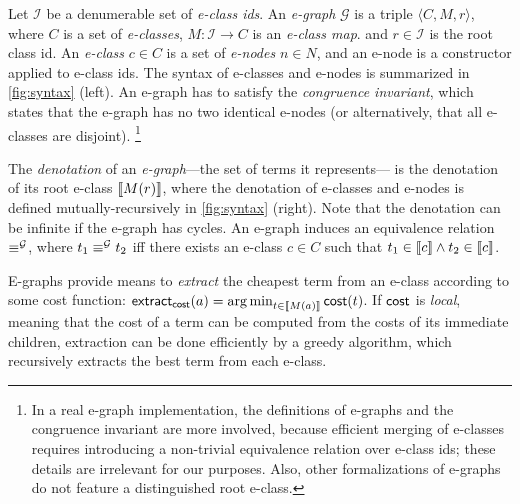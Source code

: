%
Let $\mathcal{I}$ be a denumerable set of \emph{e-class ids}.
%
An \emph{e-graph} $\mathcal{G}$ is a triple $\langle C, M, r\rangle$,
where $C$ is a set of \emph{e-classes},
$M\colon \mathcal{I} \to C$ is an \emph{e-class map}.
and $r\in \mathcal{I}$ is the root class id.
%
An \emph{e-class} $c \in C$ is a set of \emph{e-nodes} $n \in N$,
and an e-node is a constructor applied to e-class ids.
%
The syntax of e-classes and e-nodes is summarized in \autoref{fig:syntax} (left).
An e-graph has to satisfy the \emph{congruence invariant},
which states that the e-graph has no two identical e-nodes
(or alternatively, that all e-classes are disjoint).%
\footnote{In a real e-graph implementation, the definitions of e-graphs and the congruence invariant
are more involved, 
because efficient merging of e-classes requires introducing a non-trivial equivalence relation over e-class ids;
these details are irrelevant for our purposes.
Also, other formalizations of e-graphs do not feature a distinguished root e-class.} 

The \emph{denotation} of an \emph{e-graph}---the set of terms it represents---%
is the denotation of its root e-class $\llbracket M(r) \rrbracket$,
where the denotation of e-classes and e-nodes is defined mutually-recursively
in \autoref{fig:syntax} (right).
%
Note that the denotation can be infinite if the e-graph has cycles.
An e-graph induces an equivalence relation $\equiv^{\mathcal{G}}$, 
where $t_1 \equiv^{\mathcal{G}} t_2$ iff there exists an e-class $c \in C$ such that $t_1 \in \llbracket c \rrbracket \wedge t_2\in \llbracket c \rrbracket$.

E-graphs provide means to \emph{extract} the cheapest term from an e-class according to some cost function:
$\mathsf{extract}_{\mathsf{cost}}(a) = \operatorname*{arg\,min}_{t\in \llbracket M(a) \rrbracket} \mathsf{cost}(t)$.
%
If $\mathsf{cost}$ is \emph{local},
 meaning that the cost of a term can be computed 
 from the costs of its immediate children,
extraction can be done efficiently by a greedy algorithm,
which recursively extracts the best term from each e-class.

